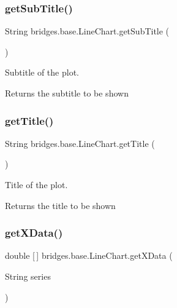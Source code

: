 \subsubsection{\texorpdfstring{getSubTitle()}{getSubTitle()}}
{\footnotesize\ttfamily String bridges.\+base.\+Line\+Chart.\+get\+Sub\+Title (\begin{DoxyParamCaption}{ }\end{DoxyParamCaption})}



Subtitle of the plot. 

\begin{DoxyReturn}{Returns}
the subtitle to be shown 
\end{DoxyReturn}
\mbox{\label{classbridges_1_1base_1_1_line_chart_aedc5f75b158298b755ba0c31bcf84138}} 
\subsubsection{\texorpdfstring{getTitle()}{getTitle()}}
{\footnotesize\ttfamily String bridges.\+base.\+Line\+Chart.\+get\+Title (\begin{DoxyParamCaption}{ }\end{DoxyParamCaption})}



Title of the plot. 

\begin{DoxyReturn}{Returns}
the title to be shown 
\end{DoxyReturn}
\mbox{\label{classbridges_1_1base_1_1_line_chart_a34ef6ace0633d287a78d0e224f38f2ed}} 
\subsubsection{\texorpdfstring{getXData()}{getXData()}}
{\footnotesize\ttfamily double \mbox{[}$\,$\mbox{]} bridges.\+base.\+Line\+Chart.\+get\+X\+Data (\begin{DoxyParamCaption}\item[{String}]{series }\end{DoxyParamCaption})}



